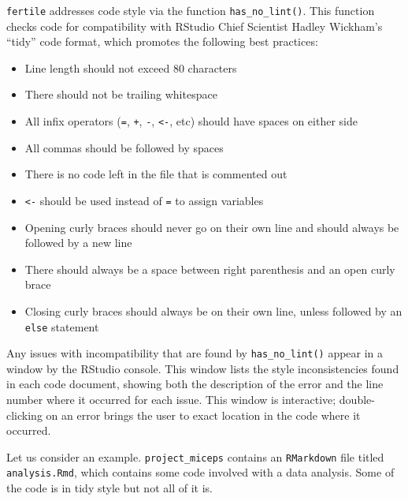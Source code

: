 \documentclass[12pt,twoside]{reedthesis}
\providecommand{\tightlist}{%
  \setlength{\itemsep}{0pt}\setlength{\parskip}{0pt}}
\begin{document}
\texttt{fertile} addresses code style via the function \texttt{has\_no\_lint()}. This function checks code for compatibility with RStudio Chief Scientist Hadley Wickham's ``tidy'' code format, which promotes the following best practices:
\begin{itemize}
\tightlist
\item
  Line length should not exceed 80 characters
\item
  There should not be trailing whitespace
\item
  All infix operators (\texttt{=}, \texttt{+}, \texttt{-}, \texttt{\textless{}-}, etc) should have spaces on either side
\item
  All commas should be followed by spaces
\item
  There is no code left in the file that is commented out
\item
  \texttt{\textless{}-} should be used instead of \texttt{=} to assign variables
\item
  Opening curly braces should never go on their own line and should always be followed by a new line
\item
  There should always be a space between right parenthesis and an open curly brace
\item
  Closing curly braces should always be on their own line, unless followed by an \texttt{else} statement
\end{itemize}
Any issues with incompatibility that are found by \texttt{has\_no\_lint()} appear in a window by the RStudio console. This window lists the style inconsistencies found in each code document, showing both the description of the error and the line number where it occurred for each issue. This window is interactive; double-clicking on an error brings the user to exact location in the code where it occurred.

Let us consider an example. \texttt{project\_miceps} contains an \texttt{RMarkdown} file titled \texttt{analysis.Rmd}, which contains some code involved with a data analysis. Some of the code is in tidy style but not all of it is.
\end{document}

